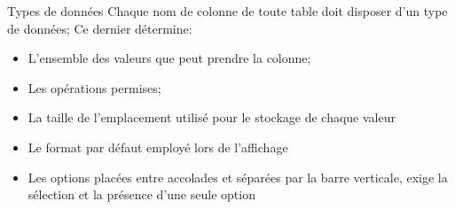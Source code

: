 \documentclass{beamer}
\begin{document}
\begin{frame}{Types de donn\'ees}
Chaque nom de colonne de toute table doit disposer d'un type de donn\'ees;
\newline Ce dernier d\'etermine:
\begin{itemize}

\item L'ensemble des valeurs que peut prendre la colonne;
\item Les op\'erations permises;
\item La taille de l'emplacement utilis\'e pour le stockage de chaque valeur
\item Le format par d\'efaut employ\'e lors de l'affichage
\item Les options plac\'ees entre accolades et s\'epar\'ees par la barre verticale, exige la s\'election et la pr\'esence d'une seule option
\end{itemize}
\end{frame}
\end{document}
